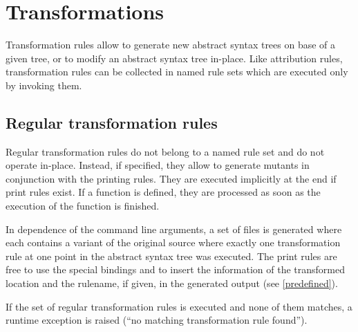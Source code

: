 \chapter{Transformations}\label{trans}

Transformation rules allow to generate new abstract syntax trees
on base of a given tree, or to modify an abstract syntax tree in-place.
Like attribution rules, transformation rules can be collected in named
rule sets which are executed only by invoking them.

\section{Regular transformation rules}

Regular transformation rules do not belong to a named rule set and do not
operate in-place. Instead, if specified, they allow to generate mutants
in conjunction with the printing rules. They are executed implicitly at
the end if print rules exist. If a  function is
defined, they are processed as soon as the execution of the 
function is finished.

In dependence of the command line arguments, a set of files is generated
where each contains a variant of the original source where exactly
one transformation rule at one point in the abstract syntax tree
was executed. The print rules are free to use the special bindings
 and 
to insert the information of the transformed location and the rulename,
if given, in the generated output (see \ref{predefined}).

If the set of regular transformation rules is executed and none of
them matches, a runtime exception is raised (``no matching transformation
rule found'').

\begin{grammar}
      \produces {} 
	 \lextoken{\{} 
	 \lextoken{\}} \\
      \produces {} \lextoken{;} \\
      \produces {}
	  \lextoken{;} \\
      \produces {}
	 \lextoken{->} \nextline
	  \\
      \produces {}
	 \lextoken{->} \nextline {}
	  \\
      \produces {}
	 \lextoken{->} \nextline {}
	  \\
\end{grammar}


